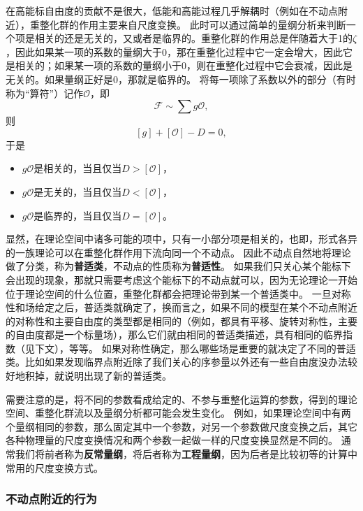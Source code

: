 \documentclass[hyperref, UTF8, a4paper]{ctexart}
\begin{document}
在高能标自由度的贡献不是很大，低能和高能过程几乎解耦时（例如在不动点附近），重整化群的作用主要来自尺度变换。
此时可以通过简单的量纲分析来判断一个项是相关的还是无关的，又或者是临界的。重整化群的作用总是伴随着大于1的$\zeta$，因此如果某一项的系数的量纲大于$0$，那在重整化过程中它一定会增大，因此它是相关的；如果某一项的系数的量纲小于$0$，则在重整化过程中它会衰减，因此是无关的。如果量纲正好是$0$，那就是临界的。
将每一项除了系数以外的部分（有时称为“算符”）记作$\mathcal{O}$，即
\[
    \mathcal{F} \sim \sum g \mathcal{O},
\]
则
\[
    [g] + [\mathcal{O}] - D = 0,
\]
于是
\begin{itemize}
    \item $g \mathcal{O}$是相关的，当且仅当$D > [\mathcal{O}]$，
    \item $g \mathcal{O}$是无关的，当且仅当$D < [\mathcal{O}]$，
    \item $g \mathcal{O}$是临界的，当且仅当$D = [\mathcal{O}]$。
\end{itemize}

显然，在理论空间中诸多可能的项中，只有一小部分项是相关的，也即，形式各异的一族理论可以在重整化群作用下流向同一个不动点。
因此不动点自然地将理论做了分类，称为\textbf{普适类}，不动点的性质称为\textbf{普适性}。
如果我们只关心某个能标下会出现的现象，那就只需要考虑这个能标下的不动点就可以，因为无论理论一开始位于理论空间的什么位置，重整化群都会把理论带到某一个普适类中。
一旦对称性和场给定之后，普适类就确定了，换而言之，如果不同的模型在某个不动点附近的对称性和主要自由度的类型都是相同的（例如，都具有平移、旋转对称性，主要的自由度都是一个标量场），那么它们就由相同的普适类描述，具有相同的临界指数（见下文），等等。
如果对称性确定，那么哪些场是重要的就决定了不同的普适类。比如如果发现临界点附近除了我们关心的序参量以外还有一些自由度没办法较好地积掉，就说明出现了新的普适类。

需要注意的是，将不同的参数看成给定的、不参与重整化运算的参数，得到的理论空间、重整化群流以及量纲分析都可能会发生变化。
例如，如果理论空间中有两个量纲相同的参数，那么固定其中一个参数，对另一个参数做尺度变换之后，其它各种物理量的尺度变换情况和两个参数一起做一样的尺度变换显然是不同的。
通常我们将前者称为\textbf{反常量纲}，将后者称为\textbf{工程量纲}，因为后者是比较初等的计算中常用的尺度变换方式。

\subsubsection{不动点附近的行为}
\end{document}
